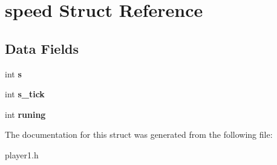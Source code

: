 \hypertarget{structspeed}{}\section{speed Struct Reference}
\label{structspeed}
\subsection*{Data Fields}
\begin{DoxyCompactItemize}
\item 
int {\bfseries s}\hypertarget{structspeed_a6859b7563cd210d8654d4c61204100d5}{}\label{structspeed_a6859b7563cd210d8654d4c61204100d5}

\item 
int {\bfseries s\+\_\+tick}\hypertarget{structspeed_a62d9fa4d9d6bae7b45961c720160a147}{}\label{structspeed_a62d9fa4d9d6bae7b45961c720160a147}

\item 
int {\bfseries runing}\hypertarget{structspeed_a52e3add3d92b8bbe7d3bf7e21598a532}{}\label{structspeed_a52e3add3d92b8bbe7d3bf7e21598a532}

\end{DoxyCompactItemize}


The documentation for this struct was generated from the following file\+:\begin{DoxyCompactItemize}
\item 
player1.\+h\end{DoxyCompactItemize}
